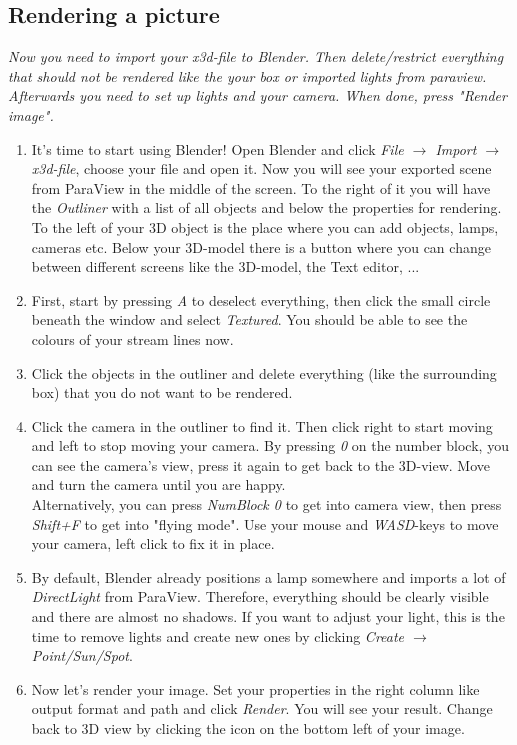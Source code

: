 \documentclass[11pt,twoside,a4paper]{fdyartcl}
\theoremstyle{myPlain}
\theoremstyle{myDefinition}
\begin{document}
\subsection{Rendering a picture}
\textit{Now you need to import your x3d-file to Blender. Then delete/restrict everything that should not be rendered like the your box or imported lights from paraview. Afterwards you need to set up lights and your camera. When done, press "Render image".}

\begin{enumerate}
	\item It's time to start using Blender! Open Blender and click \textit{File $\rightarrow$ Import $\rightarrow$ x3d-file}, choose your file and open it. Now you will see your exported scene from ParaView in the middle of the screen. To the right of it you will have the \textit{Outliner} with a list of all objects and below the properties for rendering. To the left of your 3D object is the place where you can add objects, lamps, cameras etc. Below your 3D-model there is a button where you can change between different screens like the 3D-model, the Text editor, ...
	\item First, start by pressing \textit{A} to deselect everything, then click the small circle beneath the window and select \textit{Textured}. You should be able to see the colours of your stream lines now. 
	\item Click the objects in the outliner and delete everything (like the surrounding box) that you do not want to be rendered.
	\item Click the camera in the outliner to find it. Then click right to start moving and left to stop moving your camera. By pressing \textit{0} on the number block, you can see the camera's view, press it again to get back to the 3D-view. Move and turn the camera until you are happy. \\
	Alternatively, you can press \textit{NumBlock 0} to get into camera view, then press \textit{Shift+F} to get into "flying mode". Use your mouse and \textit{WASD}-keys to move your camera, left click to fix it in place. 
	\item By default, Blender already positions a lamp somewhere and imports a lot of \textit{DirectLight} from ParaView. Therefore, everything should be clearly visible and there are almost no shadows. If you want to adjust your light, this is the time to remove lights and create new ones by clicking \textit{Create $\rightarrow$ Point/Sun/Spot}.
	\item Now let's render your image. Set your properties in the right column like output format and path and click \textit{Render}. You will see your result. Change back to 3D view by clicking the icon on the bottom left of your image. 
\end{enumerate}
\end{document}
